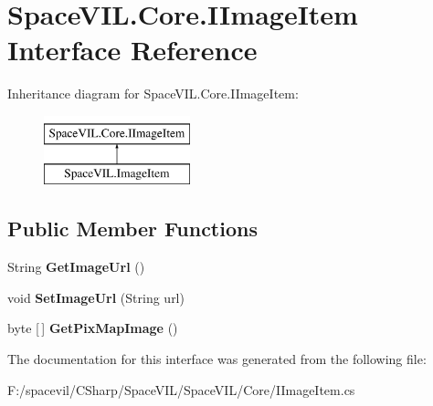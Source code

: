 \hypertarget{interface_space_v_i_l_1_1_core_1_1_i_image_item}{}\section{Space\+V\+I\+L.\+Core.\+I\+Image\+Item Interface Reference}
\label{interface_space_v_i_l_1_1_core_1_1_i_image_item}
Inheritance diagram for Space\+V\+I\+L.\+Core.\+I\+Image\+Item\+:\begin{figure}[H]
\begin{center}
\leavevmode
\includegraphics[height=2.000000cm]{interface_space_v_i_l_1_1_core_1_1_i_image_item}
\end{center}
\end{figure}
\subsection*{Public Member Functions}
\begin{DoxyCompactItemize}
\item 
\mbox{\label{interface_space_v_i_l_1_1_core_1_1_i_image_item_ac4ff6be78c3285fd28b4b80549371a9d}} 
String {\bfseries Get\+Image\+Url} ()
\item 
\mbox{\label{interface_space_v_i_l_1_1_core_1_1_i_image_item_acd75a2df3853a0ab6b832e6c4f0b0527}} 
void {\bfseries Set\+Image\+Url} (String url)
\item 
\mbox{\label{interface_space_v_i_l_1_1_core_1_1_i_image_item_af144d0b9a1fdf87852354120c1843ad9}} 
byte \mbox{[}$\,$\mbox{]} {\bfseries Get\+Pix\+Map\+Image} ()
\end{DoxyCompactItemize}


The documentation for this interface was generated from the following file\+:\begin{DoxyCompactItemize}
\item 
F\+:/spacevil/\+C\+Sharp/\+Space\+V\+I\+L/\+Space\+V\+I\+L/\+Core/I\+Image\+Item.\+cs\end{DoxyCompactItemize}

